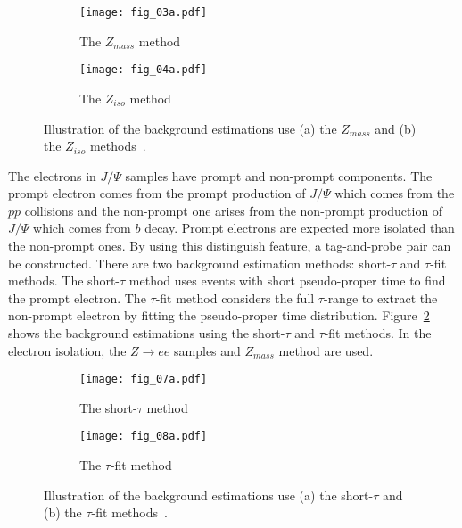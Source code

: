 \begin{figure}[htbp]
    \begin{subfigure}[b]{0.48\textwidth}
        \begin{center}
            \texttt{[image: fig\_03a.pdf]}
            \caption{The $Z_{mass}$ method}
        \end{center}
    \end{subfigure}
    \begin{subfigure}[b]{0.48\textwidth}
        \begin{center}
            \texttt{[image: fig\_04a.pdf]}
            \caption{The $Z_{iso}$ method}
        \end{center}
    \end{subfigure}
    \caption{Illustration of the background estimations use (a) the $Z_{mass}$ and (b) the $Z_{iso}$ methods~\cite{ATLAS:2016iqc}.}
    \label{fig:app_electron_isolation_Zee_background_subtraction_methods}
\end{figure}

The electrons in $J/\Psi$ samples have prompt and non-prompt components.
The prompt electron comes from the prompt production of $J/\Psi$ which comes from the $pp$ collisions and the non-prompt one arises from the non-prompt production of $J/\Psi$ which comes from $b$ decay.
Prompt electrons are expected more isolated than the non-prompt ones.
By using this distinguish feature, a tag-and-probe pair can be constructed.
There are two background estimation methods: short-$\tau$ and $\tau$-fit methods.
The short-$\tau$ method uses events with short pseudo-proper time to find the prompt electron.
The $\tau$-fit method considers the full $\tau$-range to extract the non-prompt electron by fitting the pseudo-proper time distribution.
Figure~\ref{fig:app_electron_isolation_JPsi_background_subtraction_methods} shows the background estimations using the short-$\tau$ and $\tau$-fit methods.
In the electron isolation, the $Z \to ee$ samples and $Z_{mass}$ method are used.

\begin{figure}[htbp]
    \begin{subfigure}[b]{0.48\textwidth}
        \begin{center}
            \texttt{[image: fig\_07a.pdf]}
            \caption{The short-$\tau$ method}
        \end{center}
    \end{subfigure}
    \begin{subfigure}[b]{0.48\textwidth}
        \begin{center}
            \texttt{[image: fig\_08a.pdf]}
            \caption{The $\tau$-fit method}
        \end{center}
    \end{subfigure}
    \caption{Illustration of the background estimations use (a) the short-$\tau$ and (b) the $\tau$-fit methods~\cite{Aaboud:2016vfy}.}
    \label{fig:app_electron_isolation_JPsi_background_subtraction_methods}
\end{figure}


